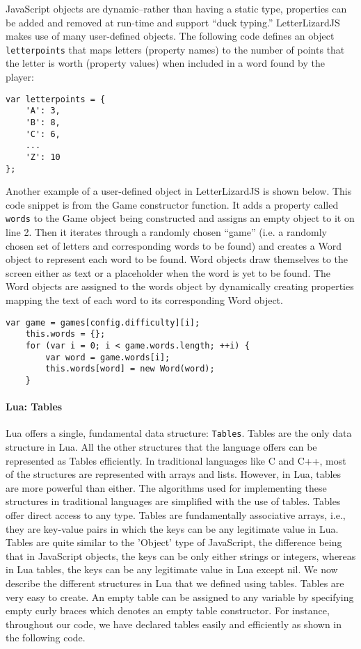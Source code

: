 JavaScript objects are dynamic--rather than having a static type, properties can be added
and removed at run-time and support ``duck typing.'' LetterLizardJS makes use of many
user-defined objects. The following code defines an object \texttt{letterpoints} that
maps letters (property names) to the number of points that the letter is worth
(property values) when included in a word found by the player:

\begin{lstlisting}[caption=A user-defined object in JavaScript.]
var letterpoints = {
	'A': 3,
	'B': 8,
	'C': 6,
	...
	'Z': 10
};
\end{lstlisting}

Another example of a user-defined object in LetterLizardJS is shown below. This code
snippet is from the Game constructor function. It adds a property called 
\texttt{words} to the Game object being constructed and assigns an empty object
to it on line 2. Then it iterates through a randomly chosen ``game'' (i.e. a
randomly chosen set of letters and corresponding words to be found) and creates
a Word object to represent each word to be found. Word objects draw themselves to the
screen either as text or a placeholder when the word is yet to be found. The Word
objects are assigned to the words object by dynamically creating properties mapping
the text of each word to its corresponding Word object.

\begin{lstlisting}[caption=A user-defined object demonstrating dynamic properties.]
	var game = games[config.difficulty][i];
	this.words = {};
	for (var i = 0; i < game.words.length; ++i) {
		var word = game.words[i];
		this.words[word] = new Word(word);
	}
\end{lstlisting}

\paragraph{Lua: Tables}

Lua offers a single, fundamental data structure: \texttt{Tables}. Tables are the only data structure in Lua. All the other structures that the language offers can be represented as Tables efficiently. In traditional languages like C and C++, most of the structures are represented with arrays and lists. However, in Lua, tables are more powerful than either. The algorithms used for implementing these structures in traditional languages are simplified with the use of tables. Tables offer direct access to any type. Tables are fundamentally associative arrays, i.e., they are key-value pairs in which the keys can be any legitimate value in Lua. Tables are quite similar to the 'Object' type of JavaScript, the difference being that in JavaScript objects, the keys can be only either strings or integers, whereas in Lua tables, the keys can be any legitimate value in Lua except nil. We now describe the different structures in Lua that we defined using tables.
Tables are very easy to create. An empty table can be assigned to any variable by specifying empty curly braces which denotes an empty table constructor. For instance, throughout our code, we have declared tables easily and efficiently as shown in the following code.

